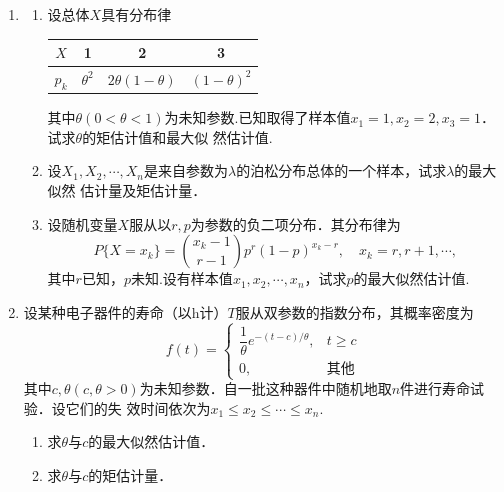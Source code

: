 \begin{enumerate}
    \item \begin{enumerate}
        \item 设总体$X$具有分布律
        \renewcommand{\arraystretch}{1.3}
        \begin{table}[H]\centering
            \begin{tabular}{c|ccc}
            $X$   & 1            & 2          & 3                                 \\ \hline
            $p_k$ & $\theta^2$ & $2\theta(1-\theta)$ & $(1-\theta)^2$ 
            \end{tabular}
        \end{table}
        \renewcommand{\arraystretch}{1.0}
        其中$\theta(0<\theta<1)$为未知参数.已知取得了样本值$x_1=1,x_2=2,x_3=1$．试求$\theta$的矩估计值和最大似
        然估计值.
        \item 设$X_1,X_2,\cdots,X_n$是来自参数为$\lambda$的泊松分布总体的一个样本，试求$\lambda$的最大似然
        估计量及矩估计量．
        \item 设随机变量$X$服从以$r,p$为参数的负二项分布．其分布律为
        $$P\{X=x_k\}=\binom{x_k-1}{r-1}p^r(1-p)^{x_k-r},\quad x_k=r,r+1,\cdots,$$
        其中$r$已知，$p$未知.设有样本值$x_1,x_2,\cdots,x_n$，试求$p$的最大似然估计值. 
    \end{enumerate}




    \item 设某种电子器件的寿命（以h计）$T$服从双参数的指数分布，其概率密度为
    $$f(t)=\left\{\begin{array}{ll}
        \dfrac{1}{\theta} e^{-(t-c)/\theta}, & t\geq c\\
        0, & \mbox{其他}
    \end{array}\right.$$
    其中$c,\theta(c,\theta>0)$为未知参数．自一批这种器件中随机地取$n$件进行寿命试验．设它们的失
    效时间依次为$x_1\leq x_2\leq \cdots \leq x_n$.
    \begin{enumerate}
        \item 求$\theta$与$c$的最大似然估计值．
        \item 求$\theta$与$c$的矩估计量．
    \end{enumerate}





\end{enumerate}
